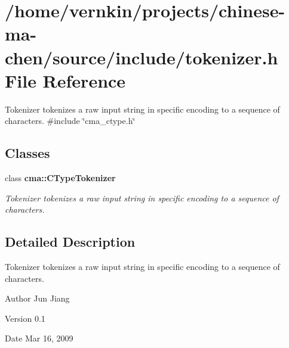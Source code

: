 \section{/home/vernkin/projects/chinese-\/ma-\/chen/source/include/tokenizer.h File Reference}
\label{tokenizer_8h}


Tokenizer tokenizes a raw input string in specific encoding to a sequence of characters.  
{\ttfamily \#include \char`\"{}cma\_\-ctype.h\char`\"{}}\par
\subsection*{Classes}
\begin{DoxyCompactItemize}
\item 
class {\bf cma::CTypeTokenizer}
\begin{DoxyCompactList}\small\item\em Tokenizer tokenizes a raw input string in specific encoding to a sequence of characters. \item\end{DoxyCompactList}\end{DoxyCompactItemize}


\subsection{Detailed Description}
Tokenizer tokenizes a raw input string in specific encoding to a sequence of characters. \begin{DoxyAuthor}{Author}
Jun Jiang 
\end{DoxyAuthor}
\begin{DoxyVersion}{Version}
0.1 
\end{DoxyVersion}
\begin{DoxyDate}{Date}
Mar 16, 2009 
\end{DoxyDate}

